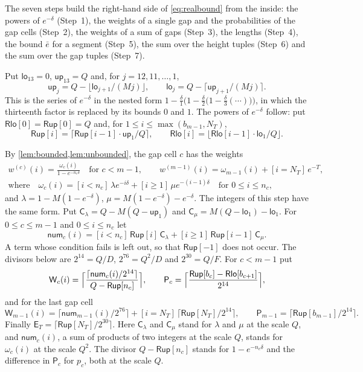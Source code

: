 The seven steps build the right-hand side of \eqref{eq:realbound} from the inside: the powers of $e^{-\delta}$ (Step~1), the weights of a single gap and the probabilities of the gap cells (Step~2), the weights of a sum of gaps (Step~3), the lengths (Step~4), the bound $\bar e$ for a segment (Step~5), the sum over the height tuples (Step~6) and the sum over the gap tuples (Step~7).

 Put $\mathsf{lo}_{13}=0$, $\mathsf{up}_{13}=Q$ and, for $j=12,11,\dots,1$,
\[
\mathsf{up}_j=Q-\lfloor \mathsf{lo}_{j+1}/(Mj)\rfloor,\qquad \mathsf{lo}_j=Q-\lceil \mathsf{up}_{j+1}/(Mj)\rceil .
\]
This is the series of $e^{-\delta}$ in the nested form $1-\tfrac{\delta}{1}\bigl(1-\tfrac{\delta}{2}\bigl(1-\tfrac{\delta}{3}(\cdots)\bigr)\bigr)$, in which the thirteenth factor is replaced by its bounds $0$ and $1$. The powers of $e^{-\delta}$ follow: put $\mathsf{Rlo}[0]=\mathsf{Rup}[0]=Q$ and, for $1\le i\le\max(b_{m-1},N_T)$,
\[
\mathsf{Rup}[i]=\lceil \mathsf{Rup}[i-1]\cdot\mathsf{up}_1/Q\rceil,\qquad \mathsf{Rlo}[i]=\lfloor \mathsf{Rlo}[i-1]\cdot\mathsf{lo}_1/Q\rfloor .
\]

 By \cref{lem:bounded,lem:unbounded}, the gap cell $c$ has the weights
\begin{gather*}
w^{(c)}(i)=\frac{\omega_c(i)}{1-e^{-n_c\delta}}\quad\text{for }c<m-1,\qquad w^{(m-1)}(i)=\omega_{m-1}(i)+[i=N_T]\,e^{-T},\\
\text{where}\quad\omega_c(i)=[i<n_c]\,\lambda e^{-i\delta}+[i\ge1]\,\mu e^{-(i-1)\delta}\quad\text{for }0\le i\le n_c,
\end{gather*}
and $\lambda=1-M(1-e^{-\delta})$, $\mu=M(1-e^{-\delta})-e^{-\delta}$. The integers of this step have the same form. Put $\mathsf{C}_\lambda=Q-M(Q-\mathsf{up}_1)$ and $\mathsf{C}_\mu=M(Q-\mathsf{lo}_1)-\mathsf{lo}_1$. For $0\le c\le m-1$ and $0\le i\le n_c$ let
\[
\mathsf{num}_c(i)=[i<n_c]\,\mathsf{Rup}[i]\,\mathsf{C}_\lambda+[i\ge1]\,\mathsf{Rup}[i-1]\,\mathsf{C}_\mu .
\]
A term whose condition fails is left out, so that $\mathsf{Rup}[-1]$ does not occur. The divisors below are $2^{14}=Q/D$, $2^{76}=Q^2/D$ and $2^{30}=Q/F$. For $c<m-1$ put
\[
\mathsf{W}_c(i)=\Bigl\lceil\frac{\lceil \mathsf{num}_c(i)/2^{14}\rceil}{Q-\mathsf{Rup}[n_c]}\Bigr\rceil,\qquad
\mathsf{P}_c=\Bigl\lceil\frac{\mathsf{Rup}[b_c]-\mathsf{Rlo}[b_{c+1}]}{2^{14}}\Bigr\rceil,
\]
and for the last gap cell
\[
\mathsf{W}_{m-1}(i)=\lceil \mathsf{num}_{m-1}(i)/2^{76}\rceil+[i=N_T]\,\lceil \mathsf{Rup}[N_T]/2^{14}\rceil,\qquad
\mathsf{P}_{m-1}=\lceil \mathsf{Rup}[b_{m-1}]/2^{14}\rceil .
\]
Finally $\mathsf{E}_T=\lceil \mathsf{Rup}[N_T]/2^{30}\rceil$. Here $\mathsf{C}_\lambda$ and $\mathsf{C}_\mu$ stand for $\lambda$ and $\mu$ at the scale $Q$, and $\mathsf{num}_c(i)$, a sum of products of two integers at the scale $Q$, stands for $\omega_c(i)$ at the scale $Q^2$. The divisor $Q-\mathsf{Rup}[n_c]$ stands for $1-e^{-n_c\delta}$ and the difference in $\mathsf{P}_c$ for $p_c$, both at the scale $Q$.

